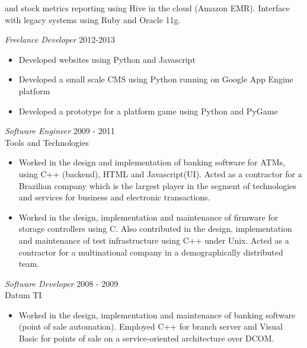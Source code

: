 \documentclass[line,margin]{res}
\begin{document}
\begin{resume}
\begin{itemize}
        and stock metrics reporting using Hive in the cloud (Amazon EMR).  Interface with legacy systems using Ruby and Oracle 11g.
		\end{itemize} 
                {\sl Freelance Developer} \hfill 2012-2013
                 \begin{itemize}  \itemsep -2pt %
                 \item Developed websites using Python and Javascript
                \item Developed a small scale CMS using Python running on Google App Engine platform
                \item Developed a prototype for a platform game using Python and PyGame
                \end{itemize}
 
                {\sl Software Engineer} \hfill            2009 - 2011\\
                Tools and Technologies 
                 \begin{itemize}  \itemsep -2pt %
                 \item Worked in the design and implementation of banking software for ATMs, using C++ (backend),
                       HTML and Javascript(UI). Acted as a contractor for a Brazilian company which is the largest player
                       in the segment of technologies and services for business and electronic transactions.
                 \item Worked in the design, implementation and maintenance of firmware for storage controllers using C. 
                       Also contributed in the design, implementation and maintenance of test infrastructure 
                       using C++ under Unix. Acted as a contractor for a multinational company in a demographically distributed team.
                 \end{itemize} 

                {\sl Software Developer} \hfill        2008 - 2009\\
                Datum TI
                  \begin{itemize}
			  \item Worked in the design, implementation and maintenance of banking software (point of sale automation). 
				  Employed C++ for branch server and Visual Basic for points of sale on a service-oriented architecture over DCOM. 
                   \end{itemize} 
 

\end{resume}
\end{document}
